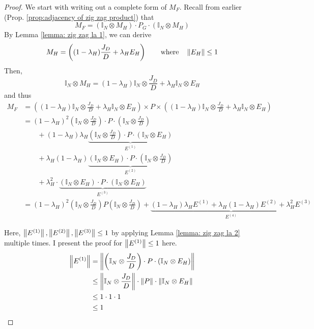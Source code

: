 \begin{proof}
	We start with writing out a complete form of $M_F$. Recall from earlier (Prop. \ref{prop:adjacency of zig zag product}) that 
	\begin{equation}
		M_F = (\mathbb I _N \otimes M_H ) \cdot P_G \cdot ( \mathbb I _ N \otimes M_H )
	\end{equation}
	By Lemma \ref{lemma: zig zag la 1}, we can derive
	\begin{equation}
		M_H = \left( ( 1- \lambda_H ) \frac{J_D}{D} + \lambda_H E_H \right) \quad\quad \text{where} \quad \left\lVert E_H\right\rVert \leq 1
	\end{equation}
	Then, 
	\begin{equation}
		\mathbb I _ N \otimes M_H = ( 1- \lambda_H) \mathbb I _N \otimes \frac{J_D}{D} + \lambda_H \mathbb I_N \otimes E_H
	\end{equation}
	and thus
	\begin{align}
		M_F 
		&= \left(
			(1 - \lambda_H) \mathbb I_N \otimes \frac{J_D}{D} + \lambda_H \mathbb I_N \otimes E_H
		\right) \times P \times \left( 
			(1 - \lambda_H) \mathbb I_N \otimes \frac{J_D}{D} + \lambda_H \mathbb I_N \otimes E_H
		\right) \\
		&= ( 1- \lambda_H )^2 \left( \mathbb I _N \otimes \frac{J_D}{D} \right) \cdot P \cdot \left( \mathbb I _N \otimes \frac{J_D}{D} \right) \\
		& \quad \quad + (1 - \lambda_H) \lambda_H \underbrace{\left( \mathbb I _N \otimes \frac{J_D}{D} \right) \cdot P \cdot ( \mathbb I _N \otimes E_H )}_{E^{(1)}} \\
		& \quad \quad + \lambda_H ( 1-\lambda_H) \underbrace{(\mathbb I _N \otimes E_H ) \cdot P \cdot \left( \mathbb I _N \otimes \frac{J_D}{D} \right)}_{E^{(2)}}  \\
		& \quad \quad + \lambda_H^2 \cdot \underbrace{(\mathbb I _N \otimes E_H ) \cdot P \cdot (\mathbb I _N \otimes E_H )} _{E^{(3)}} \\
		&= ( 1- \lambda_H )^2 \left( \mathbb I _N \otimes \frac{J_D}{D} \right) P \left( \mathbb I _N \otimes \frac{J_D}{D} \right) + \underbrace{(1 - \lambda_H)\lambda_H E^{(1)} + \lambda_H(1 - \lambda_H) E^{(2)} + \lambda_H^2 E^{(3)}}_{E^{(4)}} \label{eq:zig zag expanded M_F}
	\end{align}
	
	Here, $\left\lVert E^{(1)}\right\rVert, \left\lVert E^{(2)}\right\rVert, \left\lVert E^{(3)}\right\rVert \leq 1$ by applying Lemma \ref{lemma: zig zag la 2} multiple times. I present the proof for $\left\lVert E^{(1)}\right\rVert \leq 1$ here.
 	\begin{align}
		\left\lVert E^{(1)}\right\rVert
		&= \left\lVert \left( \mathbb I _N \otimes \frac{J_D}{D} \right) \cdot P \cdot ( \mathbb I _N \otimes E_H ) \right\rVert \\
		&\leq \left\lVert\mathbb I _N \otimes \frac{J_D}{D}\right\rVert \cdot \left\lVert P\right\rVert \cdot \left\lVert \mathbb I _N \otimes E_H\right\rVert \\
		&\leq 1 \cdot 1 \cdot 1 \\
		&\leq 1
	\end{align}
	

\end{proof}
